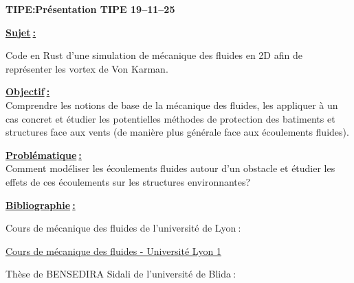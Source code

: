 \documentclass{article}
\begin{document}
\begin{center}
\huge \textbf{TIPE:\@ Présentation TIPE 19--11--25}
\end{center}

\vspace{5mm}

\raggedright{\Large {\textcolor{OliveGreen}{\underline{\textbf{Sujet$ \ $:}}}}}\newline

\large Code en Rust d'une simulation de mécanique des fluides en 2D afin
de représenter les vortex de Von Karman.
\vspace{3mm}\\

\raggedright{\Large {\textcolor{OliveGreen}{\underline{\textbf{Objectif$ \ $:}}}}}
\vspace{3mm}\\

\large Comprendre les notions de base de la mécanique des fluides, les appliquer à un cas 
concret et étudier les potentielles méthodes de protection des batiments et structures face
aux vents (de manière plus générale face aux écoulements fluides).

\vspace{3mm}
\Large {\textcolor{OliveGreen}{\underline{ \textbf{Problématique$ \ $:}}}}
\vspace{3mm}\\

\large Comment modéliser les écoulements fluides autour d'un obstacle et étudier les
effets de ces écoulements sur les structures environnantes?\newline


\large 

\Large {\textcolor{OliveGreen}{\underline{\textbf{Bibliographie$ \ $:}}}}\newline

\large Cours de mécanique des fluides de l'université de Lyon$ \ $:

\begin{tcolorbox}[colback=white, colframe=gray]
  \normalsize\hypersetup{urlcolor=blue}
  \href{https://perso.univ-lyon1.fr/marc.buffat/COURS/BOOK_MECAFLU_HTML/intro.html}{Cours de mécanique des fluides - Université Lyon 1}
\end{tcolorbox}

\vspace{2em}

\large Thèse de BENSEDIRA Sidali de l'université de Blida$ \ $:
\end{document}
